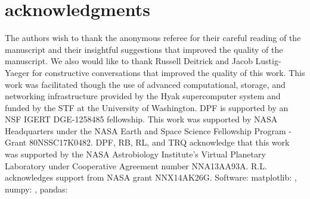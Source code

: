 \section{acknowledgments}
The authors wish to thank the anonymous referee for their careful reading of the manuscript and their insightful suggestions that improved the quality of the manuscript.  We also would like to thank Russell Deitrick and Jacob Lustig-Yaeger for constructive conversations that improved the quality of this work.  This work was facilitated though the use of advanced computational, storage, and networking infrastructure provided by the Hyak supercomputer system and funded by the STF at the University of Washington. DPF is supported by an NSF IGERT DGE-1258485 fellowship.  This work was supported by NASA Headquarters under the NASA Earth and Space Science Fellowship Program - Grant 80NSSC17K0482.  DPF, RB, RL, and TRQ acknowledge that this work was supported by the NASA Astrobiology Institute's Virtual Planetary Laboratory under Cooperative Agreement number NNA13AA93A. R.L. acknowledges support from NASA grant NNX14AK26G. Software: matplotlib: \citet{Hunter2007}, numpy: \citet{vanderWalt2011}, pandas: \citet{Mckinney2010}





